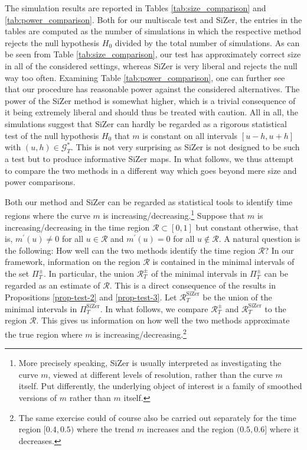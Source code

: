 The simulation results are reported in Tables \ref{tab:size_comparison} and \ref{tab:power_comparison}. Both for our multiscale test and SiZer, the entries in the tables are computed as the number of simulations in which the respective method rejects the null hypothesis $H_0$ divided by the total number of simulations. As can be seen from Table \ref{tab:size_comparison}, our test has approximately correct size in all of the considered settings, whereas SiZer is very liberal and rejects the null way too often. Examining Table \ref{tab:power_comparison}, one can further see that our procedure has reasonable power against the considered alternatives. The power of the SiZer method is somewhat higher, which is a trivial consequence of it being extremely liberal and should thus be treated with caution. All in all, the simulations suggest that SiZer can hardly be regarded as a rigorous statistical test of the null hypothesis $H_0$ that $m$ is constant on all intervals $[u-h,u+h]$ with $(u,h) \in \mathcal{G}_T^*$. This is not very surprising as SiZer is not designed to be such a test but to produce informative SiZer maps. In what follows, we thus attempt to compare the two methods in a different way which goes beyond mere size and power comparisons. 


Both our method and SiZer can be regarded as statistical tools to identify time regions where the curve $m$ is increasing/decreasing.\footnote{More precisely speaking, SiZer is usually interpreted as investigating the curve $m$, viewed at different levels of resolution, rather than the curve $m$ itself. Put differently, the underlying object of interest is a family of smoothed versions of $m$ rather than $m$ itself.} Suppose that $m$ is increasing/decreasing in the time region $\mathcal{R} \subset [0,1]$ but constant otherwise, that is, $m^\prime(u) \ne 0$ for all $u \in \mathcal{R}$ and $m^\prime(u) = 0$ for all $u \notin \mathcal{R}$. A natural question is the following: How well can the two methods identify the time region $\mathcal{R}$? In our framework, information on the region $\mathcal{R}$ is contained in the minimal intervals of the set $\Pi_T^\pm$. In particular, the union $\mathcal{R}_T^\pm$ of the minimal intervals in $\Pi_T^\pm$ can be regarded as an estimate of $\mathcal{R}$. This is a direct consequence of the results in Propositions \ref{prop-test-2} and \ref{prop-test-3}. Let $\mathcal{R}_T^{\text{SiZer}}$ be the union of the minimal intervals in $\Pi_T^{\text{SiZer}}$. In what follows, we compare $\mathcal{R}_T^\pm$ and $\mathcal{R}_T^{\text{SiZer}}$ to the region $\mathcal{R}$. This gives us information on how well the two methods approximate the true region where $m$ is increasing/decreasing.\footnote{The same exercise could of course also be carried out separately for the time region $[0.4,0.5)$ where the trend $m$ increases and the region $(0.5,0.6]$ where it decreases.} 


